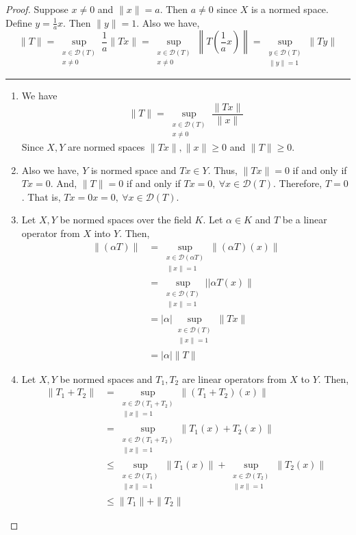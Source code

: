 \begin{proof}
	Suppose $x \ne 0$ and $\|x\| = a$.
	Then $a \ne 0$ since $X$ is a normed space.
	Define $y = \frac{1}{a}x$.
	Then $\|y\| = 1$.
	Also we have,
	\[ \|T\| = \sup_{\substack{x \in \mathscr{D}(T)\\ x \ne 0}} \frac{1}{a} \|Tx\| = \sup_{\substack{x \in \mathscr{D}(T)\\ x \ne 0}} \left\| T\left(\frac{1}{a}x\right)\right\| = \sup_{\substack{y \in \mathscr{D}(T) \\ \|y\| = 1}} \| Ty\| \]

	\hrule \vspace{1em}

	\begin{enumerate}
		\item We have 
			\[ \|T\| = \sup_{\substack{x \in \mathscr{D}(T) \\ x \ne 0}} \frac{\|Tx\|}{\|x\|} \]
			Since $X,Y$ are normed spaces $\|Tx\|, \|x\| \ge 0$ and $\|T\| \ge 0$.
		\item
			Also we have, $Y$ is normed space and $Tx \in Y$.
			Thus, $\|Tx\| = 0$ if and only if $Tx = 0$.
			And, $\| T \| = 0$ if and only if $Tx = 0,\ \forall x \in \mathscr{D}(T)$.
			Therefore, $T = 0$.
			That is, $Tx = 0x = 0,\ \forall x \in \mathscr{D}(T)$.
		\item 
			Let $X,Y$ be normed spaces over the field $K$.
			Let $\alpha \in K$ and $T$ be a linear operator from $X$ into $Y$.
			Then,
		\begin{align*}
			\| (\alpha T) \|
			& = \sup_{\substack{x \in \mathscr{D}(\alpha T)\\ \|x\| = 1}} \|(\alpha T)(x)\| \\
			& = \sup_{\substack{x \in \mathscr{D}(T)\\ \| x \| = 1}} || \alpha T(x) \| \\
			& = |\alpha| \sup_{\substack{x \in \mathscr{D}(T) \\ \|x\| = 1}} \| Tx \| \\
			& = |\alpha| \|T\|
		\end{align*}
		\item 
			Let $X,Y$ be normed spaces and $T_1,T_2$ are linear operators from $X$ to $Y$.
			Then,
		\begin{align*}
			\| T_1+T_2 \| 
			& = \sup_{\substack{x \in \mathscr{D}(T_1+T_2) \\ \|x\|=1}} \|(T_1+T_2)(x)\| \\
			& = \sup_{\substack{x \in \mathscr{D}(T_1+T_2) \\ \|x\|=1}} \|T_1(x) + T_2(x)\| \\
			& \le \sup_{\substack{x \in \mathscr{D}(T_1)\\ \|x\|=1}} \|T_1(x)\| + \sup_{\substack{x \in\mathscr{D}(T_2)\\ \|x\|=1}} \|T_2(x)\| \\
			& \le \|T_1\| + \|T_2\|
		\end{align*}

	\end{enumerate}
\end{proof}

